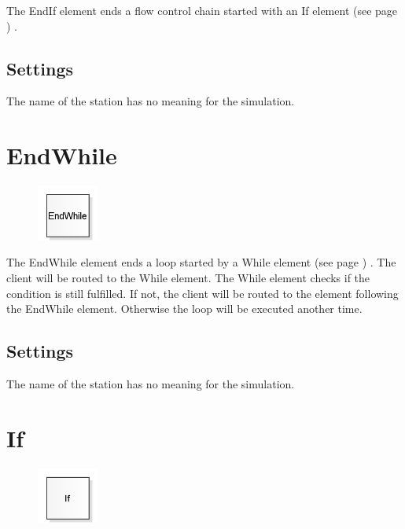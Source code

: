 The EndIf element ends a flow control chain
started with an
If element (see page \pageref{ref:ModelElementLogicEndIf}) .

\subsection*{Settings}

The name of the station has no meaning for the simulation.


\section{EndWhile}
\label{ref:ModelElementLogicEndWhile}

\begin{figure}
\vspace{-22pt}
\includegraphics[width=2cm]{imageModelElementLogicEndWhile.png}
\vspace{-22pt}
\end{figure}

The EndWhile element ends a loop started by a
While element (see page \pageref{ref:ModelElementLogicWhile}) .
The client will be routed to the While element.
The While element checks if the condition is still
fulfilled. If not, the client will be routed to the
element following the EndWhile element. Otherwise
the loop will be executed another time.

\subsection*{Settings}

The name of the station has no meaning for the simulation.


\section{If}
\label{ref:ModelElementLogicIf}

\begin{figure}
\vspace{-22pt}
\includegraphics[width=2cm]{imageModelElementLogicIf.png}
\vspace{-22pt}
\end{figure}

